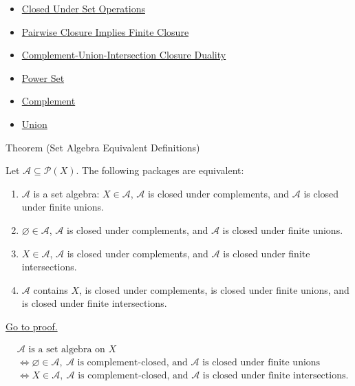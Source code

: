 
\begin{dependencies}
\begin{itemize}
  \item \hyperref[def:closed-under-set-operation-vocabulary]{Closed Under Set Operations}
  \item \hyperref[thm:pairwise-closure-implies-finite-closure]{Pairwise Closure Implies Finite Closure}
  \item \hyperref[thm:complement-union-intersection-closure-duality]{Complement-Union-Intersection Closure Duality}
  \item \hyperref[def:power-set]{Power Set}
  \item \hyperref[def:complement]{Complement}
  \item \hyperref[def:union]{Union}
\end{itemize}
\end{dependencies}

\begin{theorembox}{Theorem (Set Algebra Equivalent Definitions)}
\begin{theorem}\label{thm:set-algebra-equivalent-definitions}
Let \(\mathcal A\subseteq\mathcal P(X)\).  The following packages are
equivalent:
\begin{enumerate}[label=(\roman*)]
\item \(\mathcal A\) is a set algebra: \(X\in\mathcal A\), \(\mathcal A\) is
      closed under complements, and \(\mathcal A\) is closed under finite
      unions.
\item \(\varnothing\in\mathcal A\), \(\mathcal A\) is closed under
      complements, and \(\mathcal A\) is closed under finite unions.
\item \(X\in\mathcal A\), \(\mathcal A\) is closed under complements, and
      \(\mathcal A\) is closed under finite intersections.
\item \(\mathcal A\) contains \(X\), is closed under complements, is closed
      under finite unions, and is closed under finite intersections.
\end{enumerate}
\hyperref[prf:set-algebra-equivalent-definitions]{Go to proof.}
\end{theorem}
\end{theorembox}

\begin{remark*}
\[
\begin{aligned}
&\mathcal A\text{ is a set algebra on }X\\
&\iff
\varnothing\in\mathcal A,\ \mathcal A\text{ is complement-closed, and }
\mathcal A\text{ is closed under finite unions}\\
&\iff
X\in\mathcal A,\ \mathcal A\text{ is complement-closed, and }
\mathcal A\text{ is closed under finite intersections}.
\end{aligned}
\]
\end{remark*}

